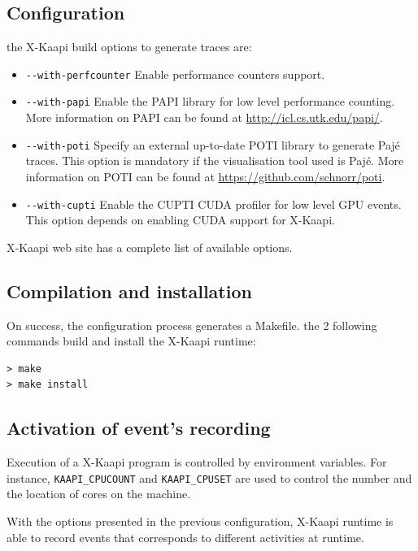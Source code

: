 \documentclass{article}[12pt]
\newcommand{\kaapi}{\textsc{X}-Kaapi\xspace}
\begin{document}
\subsection{Configuration}
the \kaapi build options to generate traces are:
\begin{itemize} %
\item \verb+--with-perfcounter+\newline
Enable performance counters support.
\item \verb+--with-papi+\newline
Enable the PAPI library for low level performance counting.
More information on PAPI can be found at \url{http://icl.cs.utk.edu/papi/}.
\item \verb+--with-poti+\newline
Specify an external up-to-date POTI library to generate Paj\'e traces.
This option is mandatory if the visualisation tool used is Paj\'e.
More information on POTI can be found at \url{https://github.com/schnorr/poti}. 
\item \verb+--with-cupti+\newline
Enable the CUPTI CUDA profiler for low level GPU events.
This option depends on enabling CUDA support for \kaapi.
\end{itemize} %

\kaapi web site has a complete list of available options. 

\subsection{Compilation and installation}
On success, the configuration process generates a Makefile. the 2 following
commands build and install the \kaapi runtime:
\begin{verbatim}
> make
> make install
\end{verbatim}

\subsection{Activation of event's recording}
Execution of a \kaapi program is controlled by environment variables.
For instance, \verb+KAAPI_CPUCOUNT+ and \verb+KAAPI_CPUSET+ are used
to control the number and the location of cores on the machine.

With the options presented in the previous configuration, \kaapi runtime is able to record events that corresponds to different activities at runtime. 
\end{document}

